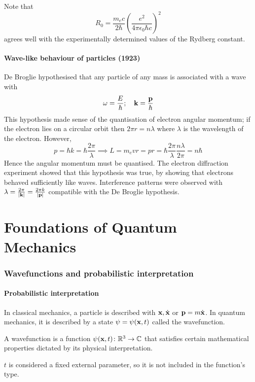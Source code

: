 \documentclass[a4paper]{article}
\begin{document}
Note that 
\[
R_0=\frac{m_e c}{2 \hbar}\left(\frac{e^2}{4 \pi \epsilon_0 \hbar c}\right)^2
\]
agrees well with the experimentally determined values of the Rydberg constant.

\subsection{Wave-like behaviour of particles (1923)}
De Broglie hypothesised that any particle of any mass is associated with a wave with
\[
	\omega = \frac{E}{\hbar}; \quad \vb k = \frac{\vb p}{\hbar}
\]
This hypothesis made sense of the quantisation of electron angular momentum; if the electron lies on a circular orbit then \( 2 \pi r = n \lambda \) where \( \lambda \) is the wavelength of the electron.
However,
\[
	p = \hbar k = \hbar \frac{2 \pi}{\lambda} \implies L = m_e v r = p r = \hbar \frac{2 \pi}{\lambda} \frac{n \lambda}{2 \pi} = n \hbar
\]
Hence the angular momentum must be quantised.
The electron diffraction experiment showed that this hypothesis was true, by showing that electrons behaved sufficiently like waves.
Interference patterns were observed with \( \lambda = \frac{2 \pi}{\abs{\vb k}} = \frac{2 \pi k}{\abs{\vb p}} \) compatible with the De Broglie hypothesis.

\clearpage

\part{Foundations of Quantum Mechanics}
\section{Wavefunctions and probabilistic interpretation}
\subsection{Probabilistic interpretation}

In classical mechanics, a particle is described with \( \vb x, \dot{\vb x} \) or \( \vb p = m \dot{\vb x} \).
In quantum mechanics, it is described by a state \( \psi= \psi(\vb x, t) \) called the wavefunction.

\begin{definition}
    A wavefunction is a function \( \psi(\vb x, t) \colon \mathbb R^3 \to \mathbb C \) that satisfies certain mathematical properties dictated by its physical interpretation.
\end{definition}
\begin{note}
    \( t \) is considered a fixed external parameter, so it is not included in the function's type.
\end{note}
\end{document}
